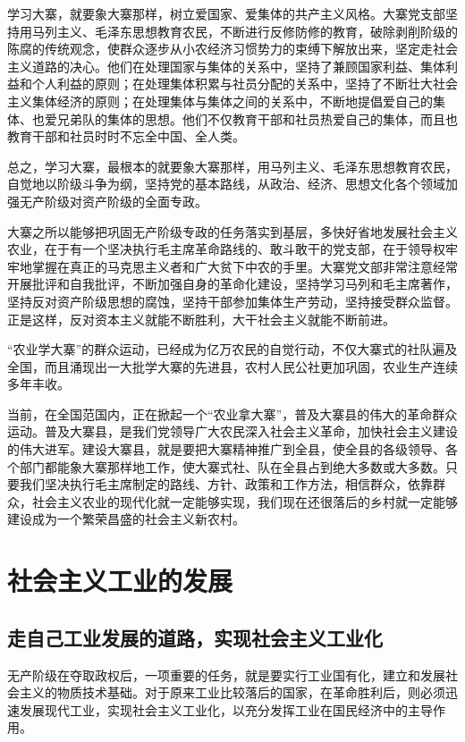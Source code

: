 \documentclass{book}
\begin{document}
学习大寨，就要象大寨那样，树立爱国家、爱集体的共产主义风格。大寨党支部坚持用马列主义、毛泽东思想教育农民，不断进行反修防修的教育，破除剥削阶级的陈腐的传统观念，使群众逐步从小农经济习惯势力的束缚下解放出来，坚定走社会主义道路的决心。他们在处理国家与集体的关系中，坚持了兼顾国家利益、集体利益和个人利益的原则；在处理集体积累与社员分配的关系中，坚持了不断壮大社会主义集体经济的原则；在处理集体与集体之间的关系中，不断地提倡爱自己的集体、也爱兄弟队的集体的思想。他们不仅教育干部和社员热爱自己的集体，而且也教育干部和社员时时不忘全中国、全人类。

总之，学习大寨，最根本的就要象大寨那样，用马列主义、毛泽东思想教育农民，自觉地以阶级斗争为纲，坚持党的基本路线，从政治、经济、思想文化各个领域加强无产阶级对资产阶级的全面专政。

大寨之所以能够把巩固无产阶级专政的任务落实到基层，多快好省地发展社会主义农业，在于有一个坚决执行毛主席革命路线的、敢斗敢干的党支部，在于领导权牢牢地掌握在真正的马克思主义者和广大贫下中农的手里。大寨党文部非常注意经常开展批评和自我批评，不断加强自身的革命化建设，坚持学习马列和毛主席著作，坚持反对资产阶级思想的腐蚀，坚持干部参加集体生产劳动，坚持接受群众监督。正是这样，反对资本主义就能不断胜利，大干社会主义就能不断前进。

“农业学大寨”的群众运动，已经成为亿万农民的自觉行动，不仅大寨式的社队遍及全国，而且涌现出一大批学大寨的先进县，农村人民公社更加巩固，农业生产连续多年丰收。

当前，在全国范国内，正在掀起一个“农业拿大寨”，普及大寨县的伟大的革命群众运动。普及大寨县，是我们党领导广大农民深入社会主义革命，加快社会主义建设的伟大进军。建设大寨县，就是要把大寨精神推广到全县，使全县的各级领导、各个部门都能象大寨那样地工作，使大寨式社、队在全县占到绝大多数或大多数。只要我们坚决执行毛主席制定的路线、方针、政策和工作方法，相信群众，依靠群众，社会主义农业的现代化就一定能够实现，我们现在还很落后的乡村就一定能够建设成为一个繁荣昌盛的社会主义新农村。

\section{社会主义工业的发展}

\subsection{走自己工业发展的道路，实现社会主义工业化}

无产阶级在夺取政权后，一项重要的任务，就是要实行工业国有化，建立和发展社会主义的物质技术基础。对于原来工业比较落后的国家，在革命胜利后，则必须迅速发展现代工业，实现社会主义工业化，以充分发挥工业在国民经济中的主导作用。
\end{document}
